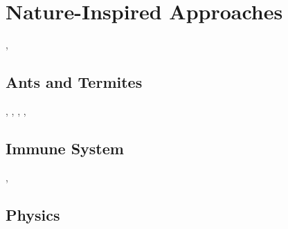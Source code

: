 \chapter{Nature-Inspired Approaches}
\label{cha:biol-insp-appr}

\cite{abelson00a}, \cite{nagpal02a}


\section{Ants and Termites}
\label{sec:ants}

\cite{kube00a}, \cite{bonabeau99a}, \cite{parunak02a},
\cite{sauter02a}, \cite{parunak97b}


\section{Immune System}
\label{sec:immune-system}

\cite{kephart91a}, \cite{kephart94a}


\section{Physics}
\label{sec:physics}

\cite{cheng05a}



